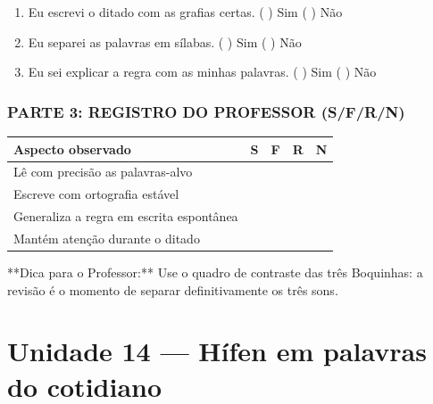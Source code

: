 \begin{exercicio}
\begin{enumerate}[label=\alph*)]
  \item Eu escrevi o ditado com as grafias certas.  \quad ( ) Sim   ( ) Não

  \item Eu separei as palavras em sílabas.  \quad ( ) Sim   ( ) Não

  \item Eu sei explicar a regra com as minhas palavras.  \quad ( ) Sim   ( ) Não

\end{enumerate}

\subsection*{PARTE 3: REGISTRO DO PROFESSOR (S/F/R/N)}

\begin{center}
\renewcommand{\arraystretch}{1.4}
\begin{tabular}{@{}p{9cm}cccc@{}}
\toprule
Aspecto observado & S & F & R & N \\
\midrule
Lê com precisão as palavras-alvo & & & & \\
Escreve com ortografia estável & & & & \\
Generaliza a regra em escrita espontânea & & & & \\
Mantém atenção durante o ditado & & & & \\
\bottomrule\end{tabular}\end{center}

\end{exercicio}

\begin{dica}
**Dica para o Professor:** Use o quadro de contraste das três Boquinhas: a revisão é o momento de separar definitivamente os três sons.
\end{dica}


\chapter{Unidade 14 --- Hífen em palavras do cotidiano}


